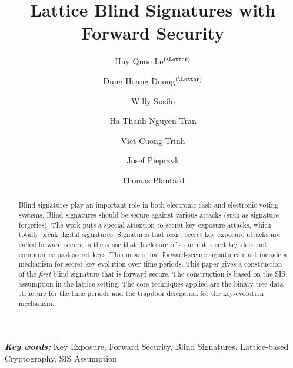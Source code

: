 \documentclass[runningheads]{llncs}
\providecommand{\keywords}[1]{\textbf{\textit{Key words: }} #1}
\begin{document}
	\title{Lattice Blind Signatures with Forward Security }

	\author{Huy Quoc Le$^\textrm{(\Letter)}$ \and Dung Hoang Duong$^\textrm{(\Letter)}$\and Willy Susilo  \and Ha Thanh Nguyen Tran \and Viet Cuong Trinh \and Josef Pieprzyk  \and  Thomas Plantard  }
	
	
	
	\maketitle              
	
\begin{abstract} Blind signatures play an important role in both electronic cash and electronic voting systems. 
Blind signatures should be secure against various attacks (such as signature forgeries). 
The work puts a special attention to secret key exposure attacks, which totally break digital signatures.
Signatures that resist secret key exposure attacks are called forward secure in the sense
that disclosure of a current secret key does not compromise past secret keys. 
This means that forward-secure signatures must include 
a mechanism for secret-key evolution over time periods.
%
This paper gives a construction of the \textit{first} blind signature that is forward secure. 
The construction is based on the SIS assumption in the lattice setting. 
The core techniques applied are the binary tree data structure 
for the time periods and the trapdoor delegation for the key-evolution mechanism.  	
	
	\end{abstract}
	\keywords{Key Exposure, Forward Security, Blind Signatures, Lattice-based Cryptography,
	SIS Assumption}
\end{document}
